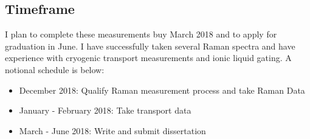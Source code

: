 \documentclass[11pt]{article}
\begin{document}
\begin{multicols}{2}
\begin{comment}
\end{comment}


\section{Timeframe}
I plan to complete these measurements buy March 2018 and to apply for graduation in June. I have successfully taken several Raman spectra and have experience with cryogenic transport measurements and ionic liquid gating. A notional schedule is below:

\begin{itemize}
	\item December 2018: Qualify Raman measurement process and take Raman Data
	\item January - February 2018: Take transport data 
	\item March - June 2018: Write and submit dissertation
\end{itemize}




\end{multicols}
\end{document}
